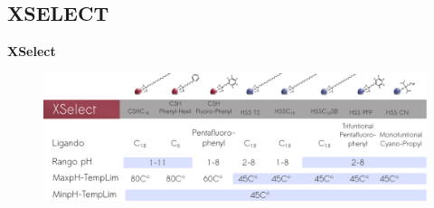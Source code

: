 \documentclass[11pt]{beamer}
\begin{document}
      \subsection{XSELECT}

      \begin{frame}{}
          \begin{center}
              \textbf{\LARGE XSelect}
          \end{center}
          \begin{figure}
              \centering
              \includegraphics[width=1\linewidth]{img/drawing_6}
              \label{fig:drawing6}
          \end{figure}

      \end{frame}
\end{document}
